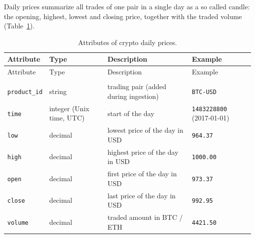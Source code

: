 \documentclass[
]{article}
\begin{document}
Daily prices summarize all trades of one pair in a single day as a so called candle: the opening, highest, lowest and closing price, together with the traded volume (Table~\ref{tbl-crypto-daily}).

\begin{longtable}[]{@{}
  >{\raggedright\arraybackslash}p{}
  >{\raggedright\arraybackslash}p{}
  >{\raggedright\arraybackslash}p{}
  >{\raggedright\arraybackslash}p{}@{}}
\toprule\noalign{}
\begin{minipage}[b]{\linewidth}\raggedright
Attribute
\end{minipage} & \begin{minipage}[b]{\linewidth}\raggedright
Type
\end{minipage} & \begin{minipage}[b]{\linewidth}\raggedright
Description
\end{minipage} & \begin{minipage}[b]{\linewidth}\raggedright
Example
\end{minipage} \\
\midrule\noalign{}
\endfirsthead
\toprule\noalign{}
\begin{minipage}[b]{\linewidth}\raggedright
Attribute
\end{minipage} & \begin{minipage}[b]{\linewidth}\raggedright
Type
\end{minipage} & \begin{minipage}[b]{\linewidth}\raggedright
Description
\end{minipage} & \begin{minipage}[b]{\linewidth}\raggedright
Example
\end{minipage} \\
\midrule\noalign{}
\endhead
\bottomrule\noalign{}
\caption{Attributes of crypto daily prices.}\label{tbl-crypto-daily}\tabularnewline
\endlastfoot
\texttt{product\_\allowbreak{}id} & string & trading pair (added during ingestion) & \texttt{BTC-\allowbreak{}USD} \\
\midrule\noalign{}
\texttt{time} & integer (Unix time, UTC) & start of the day & \texttt{1483228800} (2017-01-01) \\
\midrule\noalign{}
\texttt{low} & decimal & lowest price of the day in USD & \texttt{964.\allowbreak{}37} \\
\midrule\noalign{}
\texttt{high} & decimal & highest price of the day in USD & \texttt{1000.\allowbreak{}00} \\
\midrule\noalign{}
\texttt{open} & decimal & first price of the day in USD & \texttt{973.\allowbreak{}37} \\
\midrule\noalign{}
\texttt{close} & decimal & last price of the day in USD & \texttt{992.\allowbreak{}95} \\
\midrule\noalign{}
\texttt{volume} & decimal & traded amount in BTC / ETH & \texttt{4421.\allowbreak{}50} \\
\end{longtable}
\end{document}
